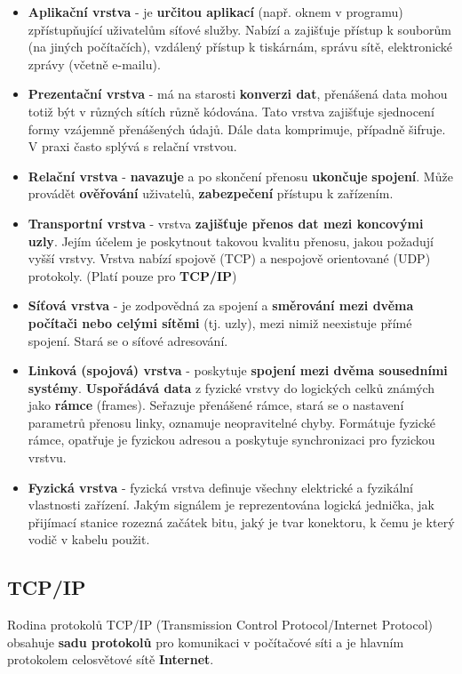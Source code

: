 \begin{itemize}
\item\textbf{Aplikační vrstva }- je \textbf{určitou aplikací} (např. oknem v programu) zpřístupňující uživatelům síťové služby. Nabízí a zajišťuje přístup k souborům (na jiných počítačích), vzdálený přístup k tiskárnám, správu sítě, elektronické zprávy (včetně e-mailu).
\item\textbf{Prezentační vrstva} - má na starosti \textbf{konverzi dat}, přenášená data mohou totiž být v různých sítích různě kódována. Tato vrstva zajišťuje sjednocení formy vzájemně přenášených údajů. Dále data komprimuje, případně šifruje. V praxi často splývá s relační vrstvou.
\item \textbf{Relační vrstva} - \textbf{navazuje} a po skončení přenosu \textbf{ukončuje} \textbf{spojení}. Může provádět \textbf{ověřování} uživatelů, \textbf{zabezpečení} přístupu k zařízením.
\item\textbf{Transportní vrstva} - vrstva\textbf{ zajišťuje přenos dat mezi koncovými uzly}. Jejím účelem je poskytnout takovou kvalitu přenosu, jakou požadují vyšší vrstvy. Vrstva nabízí spojově (TCP) a nespojově orientované (UDP) protokoly. (Platí pouze pro \textbf{TCP/IP})
\item\textbf{Síťová vrstva }- je zodpovědná za spojení a \textbf{směrování mezi dvěma počítači nebo celými sítěmi} (tj. uzly), mezi nimiž neexistuje přímé spojení. Stará se o síťové adresování.
\item \textbf{Linková (spojová) vrstva }- poskytuje \textbf{spojení mezi dvěma sousedními systémy}. \textbf{Uspořádává data} z fyzické vrstvy do logických celků známých jako \textbf{rámce} (frames). Seřazuje přenášené rámce, stará se o nastavení parametrů přenosu linky, oznamuje neopravitelné chyby. Formátuje fyzické rámce, opatřuje je fyzickou adresou a poskytuje synchronizaci pro fyzickou vrstvu.
\item\textbf{Fyzická vrstva }- fyzická vrstva definuje všechny elektrické a fyzikální vlastnosti zařízení. Jakým signálem je reprezentována logická jednička, jak přijímací stanice rozezná začátek bitu, jaký je tvar konektoru, k čemu je který vodič v kabelu použit.
\end{itemize}

\subsection{TCP/IP}
Rodina protokolů TCP/IP (Transmission Control Protocol/Internet Protocol) obsahuje \textbf{sadu protokolů} pro komunikaci v počítačové síti a je hlavním protokolem celosvětové sítě \textbf{Internet}. 

